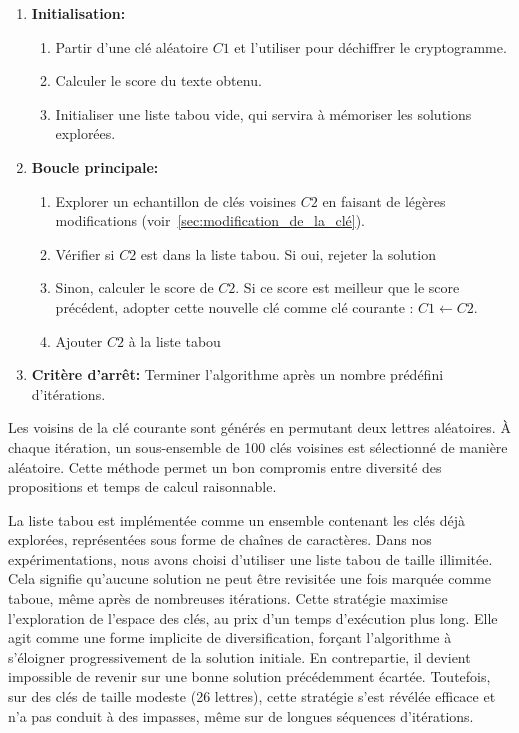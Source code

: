 \documentclass[a4paper]{article}
\begin{document}
\begin{enumerate}
    \item \textbf{Initialisation:}
    \begin{enumerate}
        \item Partir d'une clé aléatoire $C1$ et l'utiliser pour déchiffrer le cryptogramme.
        \item Calculer le score du texte obtenu.
        \item Initialiser une liste tabou vide, qui servira à mémoriser les solutions explorées.
    \end{enumerate}
    \item \textbf{Boucle principale:}
    \begin{enumerate}[label= (\alph*)]
        \item Explorer un echantillon de clés voisines $C2$ en faisant de légères modifications (voir~\ref{sec:modification_de_la_clé}).
        \item Vérifier si $C2$ est dans la liste tabou. Si oui, rejeter la solution
        \item Sinon, calculer le score de $C2$. Si ce score est meilleur que le score précédent, adopter cette nouvelle clé comme clé courante : $C1 \leftarrow C2$.
        \item Ajouter $C2$ à la liste tabou 
    \end{enumerate}
    \item \textbf{Critère d'arrêt:} Terminer l'algorithme après un nombre prédéfini d'itérations.
\end{enumerate}

Les voisins de la clé courante sont générés en permutant deux lettres aléatoires. À chaque itération, un sous-ensemble de 100 clés voisines est sélectionné de manière aléatoire. Cette méthode permet un bon compromis entre diversité des propositions et temps de calcul raisonnable.

\vspace{0.5em}

La liste tabou est implémentée comme un ensemble contenant les clés déjà explorées, représentées sous forme de chaînes de caractères. Dans nos expérimentations, nous avons choisi d’utiliser une liste tabou de taille illimitée. Cela signifie qu’aucune solution ne peut être revisitée une fois marquée comme taboue, même après de nombreuses itérations.
Cette stratégie maximise l’exploration de l’espace des clés, au prix d’un temps d’exécution plus long. Elle agit comme une forme implicite de diversification, forçant l’algorithme à s’éloigner progressivement de la solution initiale. En contrepartie, il devient impossible de revenir sur une bonne solution précédemment écartée. Toutefois, sur des clés de taille modeste (26 lettres), cette stratégie s’est révélée efficace et n’a pas conduit à des impasses, même sur de longues séquences d’itérations.
\end{document}
